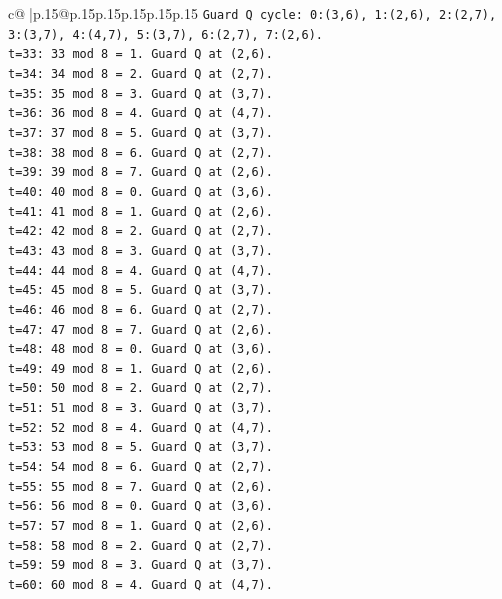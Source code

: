 \documentclass{article}
\begin{document}
{\begin{supertabular}{c@{$\;$}|p{.15\linewidth}@{}p{.15\linewidth}p{.15\linewidth}p{.15\linewidth}p{.15\linewidth}p{.15\linewidth}}
{{{\texttt{Guard Q cycle: 0:(3,6), 1:(2,6), 2:(2,7), 3:(3,7), 4:(4,7), 5:(3,7), 6:(2,7), 7:(2,6).} \\
\texttt{t=33: 33 mod 8 = 1. Guard Q at (2,6).} \\
\texttt{t=34: 34 mod 8 = 2. Guard Q at (2,7).} \\
\texttt{t=35: 35 mod 8 = 3. Guard Q at (3,7).} \\
\texttt{t=36: 36 mod 8 = 4. Guard Q at (4,7).} \\
\texttt{t=37: 37 mod 8 = 5. Guard Q at (3,7).} \\
\texttt{t=38: 38 mod 8 = 6. Guard Q at (2,7).} \\
\texttt{t=39: 39 mod 8 = 7. Guard Q at (2,6).} \\
\texttt{t=40: 40 mod 8 = 0. Guard Q at (3,6).} \\
\texttt{t=41: 41 mod 8 = 1. Guard Q at (2,6).} \\
\texttt{t=42: 42 mod 8 = 2. Guard Q at (2,7).} \\
\texttt{t=43: 43 mod 8 = 3. Guard Q at (3,7).} \\
\texttt{t=44: 44 mod 8 = 4. Guard Q at (4,7).} \\
\texttt{t=45: 45 mod 8 = 5. Guard Q at (3,7).} \\
\texttt{t=46: 46 mod 8 = 6. Guard Q at (2,7).} \\
\texttt{t=47: 47 mod 8 = 7. Guard Q at (2,6).} \\
\texttt{t=48: 48 mod 8 = 0. Guard Q at (3,6).} \\
\texttt{t=49: 49 mod 8 = 1. Guard Q at (2,6).} \\
\texttt{t=50: 50 mod 8 = 2. Guard Q at (2,7).} \\
\texttt{t=51: 51 mod 8 = 3. Guard Q at (3,7).} \\
\texttt{t=52: 52 mod 8 = 4. Guard Q at (4,7).} \\
\texttt{t=53: 53 mod 8 = 5. Guard Q at (3,7).} \\
\texttt{t=54: 54 mod 8 = 6. Guard Q at (2,7).} \\
\texttt{t=55: 55 mod 8 = 7. Guard Q at (2,6).} \\
\texttt{t=56: 56 mod 8 = 0. Guard Q at (3,6).} \\
\texttt{t=57: 57 mod 8 = 1. Guard Q at (2,6).} \\
\texttt{t=58: 58 mod 8 = 2. Guard Q at (2,7).} \\
\texttt{t=59: 59 mod 8 = 3. Guard Q at (3,7).} \\
\texttt{t=60: 60 mod 8 = 4. Guard Q at (4,7).} \\
}}}
\end{supertabular}}
\end{document}
